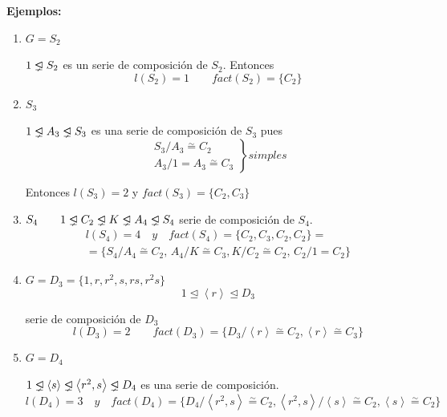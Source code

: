\documentclass{article}
\newcommand{\unlhdneq}{%
  \mathrel{\ooalign{$\lneq$\cr\raise.22ex\hbox{$\lhd$}\cr}}}
\begin{document}
\textbf{Ejemplos:}\begin{enumerate}[1)]
\item $G=S_2$

$1\unlhdneq S_2$ es un serie de composición de $S_2$. Entonces
\begin{equation*}
l(S_2)=1\qquad fact(S_2)=\{C_2\}
\end{equation*}

\item $S_3$

$1\unlhdneq A_3\unlhdneq S_3$ es una serie de composición de $S_3$ pues
\begin{equation*}
\left.\begin{array}{c}
S_3/A_3\overset{\sim}{=} C_2\\
A_3/1=A_3\overset{\sim}{=} C_3
\end{array} \right\rbrace simples
\end{equation*}

Entonces $l(S_3)=2$ y $fact(S_3)=\{C_2,C_3\}$

\item $S_4\qquad 1\unlhdneq C_2\unlhdneq K\unlhdneq A_4\unlhdneq S_4$ serie de composición de $S_4$.
\begin{gather*}
l(S_4)=4\quad y \quad fact(S_4)=\{C_2,C_3,C_2,C_2\}=\\
=\{S_4/A_4\overset{\sim}{=} C_2,\,A_4/K\overset{\sim}{=} C_3,K/C_2\overset{\sim}{=}C_2,\,C_2/1=C_2\}
\end{gather*}

\item $G=D_3=\{1,r,r^2,s,rs,r^2s\}$
\begin{equation*}
1\unlhd \left\langle r\right\rangle \unlhd D_3
\end{equation*}

serie de composición de $D_3$
\begin{equation*}
l(D_3)=2\qquad fact(D_3)=\{D_3/\left\langle r \right\rangle \overset{\sim}{=} C_2, \left\langle r \right\rangle \overset{\sim}{=} C_3\}
\end{equation*}

\item $G=D_4$

$1\unlhdneq \left\langle s \right\rangle \unlhdneq \left\langle r^2,s\right\rangle \unlhdneq D_4$ es una serie de composición.
\begin{equation*}
l(D_4)=3\quad y\quad fact(D_4)=\{D_4/\left\langle r^2,s\right\rangle \overset{\sim}{=} C_2, \left\langle r^2,s\right\rangle /\left\langle s\right\rangle \overset{\sim}{=} C_2,\left\langle s \right\rangle \overset{\sim}{=} C_2\}
\end{equation*}


\end{enumerate}
\end{document}
